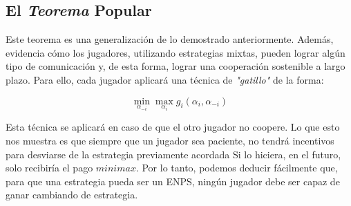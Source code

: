 \documentclass[11pt]{article}
\begin{document}
\subsection{El \textit{Teorema} Popular}

\begin{flushleft}
    Este teorema es una generalización de lo demostrado anteriormente. Además, evidencia cómo los jugadores, utilizando estrategias mixtas, pueden lograr algún tipo de comunicación y, de esta forma, lograr una cooperación sostenible a largo plazo. Para ello, cada jugador aplicará una técnica de \textit{"gatillo"} de la forma:

    \[
    \min_{\alpha_{-i}} \max_{\alpha_i} g_i(\alpha_i,\alpha_{-i})
    \]
    
    Esta técnica se aplicará en caso de que el otro jugador no coopere. Lo que esto nos muestra es que siempre que un jugador sea paciente, no tendrá incentivos para desviarse de la estrategia previamente acordada Si lo hiciera, en el futuro, solo recibiría el pago \(\textit{minimax}\). Por lo tanto, podemos deducir fácilmente que, para que una estrategia pueda ser un ENPS, ningún jugador debe ser capaz de ganar cambiando de estrategia.
\end{flushleft}
\end{document}
